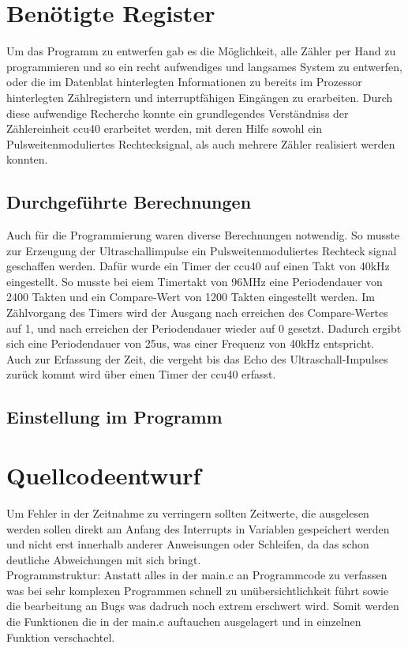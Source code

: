 \section{Benötigte Register}
Um das Programm zu entwerfen gab es die Möglichkeit, alle Zähler per Hand zu programmieren und so ein recht aufwendiges und langsames System zu entwerfen, oder die im Datenblat hinterlegten Informationen zu bereits im Prozessor hinterlegten Zählregistern und interruptfähigen Eingängen zu erarbeiten. Durch diese aufwendige Recherche konnte ein grundlegendes Verständniss der Zählereinheit ccu40 erarbeitet werden, mit deren Hilfe sowohl ein Pulsweitenmoduliertes Rechtecksignal, als auch mehrere Zähler realisiert werden konnten.

\subsection{Durchgeführte Berechnungen}
Auch für die Programmierung waren diverse Berechnungen notwendig. So musste zur Erzeugung der Ultraschallimpulse ein Pulsweitenmoduliertes Rechteck signal geschaffen werden. Dafür wurde ein Timer der ccu40 auf einen Takt von 40kHz eingestellt. So musste bei eiem Timertakt von 96MHz eine Periodendauer von 2400 Takten und ein Compare-Wert von 1200 Takten eingestellt werden. Im Zählvorgang des Timers wird der Ausgang nach erreichen des Compare-Wertes auf 1, und nach erreichen der Periodendauer wieder auf 0 gesetzt. Dadurch ergibt sich eine Periodendauer von 25us, was einer Frequenz von 40kHz entspricht.\\
Auch zur Erfassung der Zeit, die vergeht bis das Echo des Ultraschall-Impulses zurück kommt wird über einen Timer der ccu40 erfasst. 

\subsection{Einstellung im Programm}

\section{Quellcodeentwurf}
Um Fehler in der Zeitnahme zu verringern sollten Zeitwerte, die ausgelesen werden sollen direkt am Anfang des Interrupts in Variablen gespeichert werden und nicht erst innerhalb anderer Anweisungen oder Schleifen, da das schon deutliche Abweichungen mit sich bringt.\\

Programmstruktur:
Anstatt alles in der main.c an Programmcode zu verfassen was bei sehr komplexen Programmen schnell zu unübersichtlichkeit führt sowie die bearbeitung an Bugs was dadruch noch extrem erschwert wird. Somit werden die Funktionen die in der main.c auftauchen ausgelagert und in einzelnen Funktion verschachtel. \\

